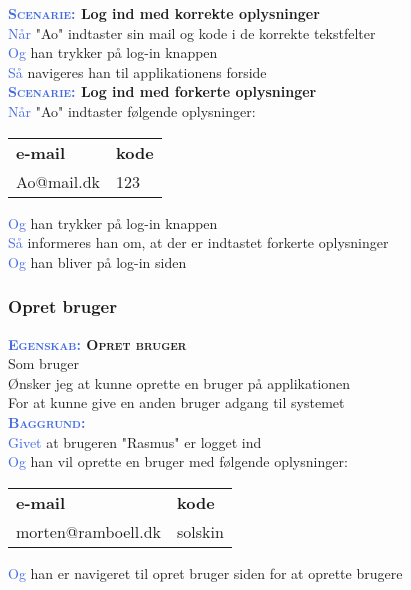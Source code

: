 \textbf{\textsc{\textcolor{RoyalBlue}{Scenarie:}} Log ind med korrekte oplysninger}\\
\textcolor{RoyalBlue}{Når} "Ao" indtaster sin mail og kode i de korrekte tekstfelter\\
\textcolor{RoyalBlue}{Og} han trykker på log-in knappen\\
\textcolor{RoyalBlue}{Så} navigeres han til applikationens forside\\

\textbf{\textsc{\textcolor{RoyalBlue}{Scenarie:}} Log ind med forkerte oplysninger} \\
\textcolor{RoyalBlue}{Når} "Ao" indtaster følgende oplysninger:\\
\begin{tabular}{| l | l |}
	\textbf{e-mail} & \textbf{kode}\\
	Ao@mail.dk & 123\\
\end{tabular}
\newline \newline
\textcolor{RoyalBlue}{Og} han trykker på log-in knappen\\
\textcolor{RoyalBlue}{Så} informeres han om, at der er indtastet forkerte oplysninger\\
\textcolor{RoyalBlue}{Og} han bliver på log-in siden\\


\subsubsection{Opret bruger} \label{sec:USOpretBruger}
\textbf{\textsc{\textcolor{RoyalBlue}{Egenskab:} Opret bruger}} \\
Som bruger\\
Ønsker jeg at kunne oprette en bruger på applikationen\\
For at kunne give en anden bruger adgang til systemet\\

\textcolor{RoyalBlue}{\textbf{\textsc{Baggrund:}}}\\
\textcolor{RoyalBlue}{Givet} at brugeren "Rasmus" er logget ind \\
\textcolor{RoyalBlue}{Og} han vil oprette en bruger med følgende oplysninger:\\
\begin{tabular}{| l | l |}
	\textbf{e-mail} & \textbf{kode} \\
	morten@ramboell.dk & solskin\\
\end{tabular}
\newline \newline
\textcolor{RoyalBlue}{Og} han er navigeret til opret bruger siden for at oprette brugere\\

